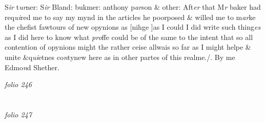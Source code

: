 \documentclass[12pt, a4paper]{book}
\begin{document}
				\marginpar[\vspace{0.5cm}{\textcolor{Gray}{M. Baker}}]{}
			 S\textit{ir} t\textit{ur}ner: S\textit{ir} Bland: bukmer: anthony p\textit{ar}son \& other: Aft\textit{er} that M\textit{r} baker had  req\textit{ui}red me to say my mynd in the articles he poorposed \& willed me  to m\textit{ar}ke the chefist fawtours of new opynions as [nihge ]as I could I did write such thing\textit{es} as I did here to know what \textit{pro}ffe could be of  the same to the intent that so all contention of opynions might the rather ceise allwais so far as I might helpe \& unite \&q\textit{ui}etnes co\textit{n}tynew here as in other partes of this realme./.  By me Edmo\textit{n}d Shether.

\dotfill
					

\textit{folio 246}


         \vspace{4cm}
         
\dotfill
					  \section*{}

\textit{folio 247}
\end{document}
